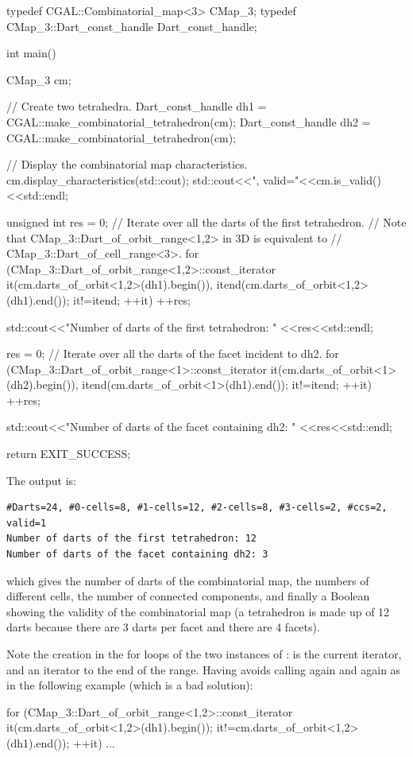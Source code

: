 \begin{ccExampleCode}
  typedef CGAL::Combinatorial_map<3> CMap_3; 
  typedef CMap_3::Dart_const_handle Dart_const_handle;

  int main() 
  { 
    CMap_3 cm;

    // Create two tetrahedra.  
    Dart_const_handle dh1 = CGAL::make_combinatorial_tetrahedron(cm); 
    Dart_const_handle dh2 = CGAL::make_combinatorial_tetrahedron(cm);
  
    // Display the combinatorial map characteristics.
    cm.display_characteristics(std::cout); 
    std::cout<<", valid="<<cm.is_valid()<<std::endl;
  
    unsigned int res = 0; 
    // Iterate over all the darts of the first tetrahedron.  
    // Note that CMap_3::Dart_of_orbit_range<1,2> in 3D is equivalent to 
    // CMap_3::Dart_of_cell_range<3>.  
    for  (CMap_3::Dart_of_orbit_range<1,2>::const_iterator
          it(cm.darts_of_orbit<1,2>(dh1).begin()),
          itend(cm.darts_of_orbit<1,2>(dh1).end()); it!=itend; ++it) 
       ++res;

    std::cout<<"Number of darts of the first tetrahedron: "
             <<res<<std::endl;

    res = 0; 
    // Iterate over all the darts of the facet incident to dh2.  
    for (CMap_3::Dart_of_orbit_range<1>::const_iterator
         it(cm.darts_of_orbit<1>(dh2).begin()),
         itend(cm.darts_of_orbit<1>(dh1).end()); it!=itend; ++it) 
       ++res;
  
    std::cout<<"Number of darts of the facet containing dh2: "
             <<res<<std::endl; 

    return EXIT_SUCCESS;
}
\end{ccExampleCode}

The output is:
\begin{verbatim}
#Darts=24, #0-cells=8, #1-cells=12, #2-cells=8, #3-cells=2, #ccs=2, valid=1
Number of darts of the first tetrahedron: 12
Number of darts of the facet containing dh2: 3
\end{verbatim}

which gives the number of darts of the combinatorial map, the numbers
of different cells, the number of connected components, and finally a
Boolean showing the validity of the combinatorial map (a tetrahedron
is made up of 12 darts because there are 3 darts per facet and there
are 4 facets).

Note the creation in the for loops of the two instances of
:  is the current iterator,
and  an iterator to the end of the range. Having
 avoids calling 
again and again as in the following example (which is a bad
solution):
\begin{ccExampleCode}
  for (CMap_3::Dart_of_orbit_range<1,2>::const_iterator 
       it(cm.darts_of_orbit<1,2>(dh1).begin());
       it!=cm.darts_of_orbit<1,2>(dh1).end()); ++it)
  {...}
\end{ccExampleCode}

